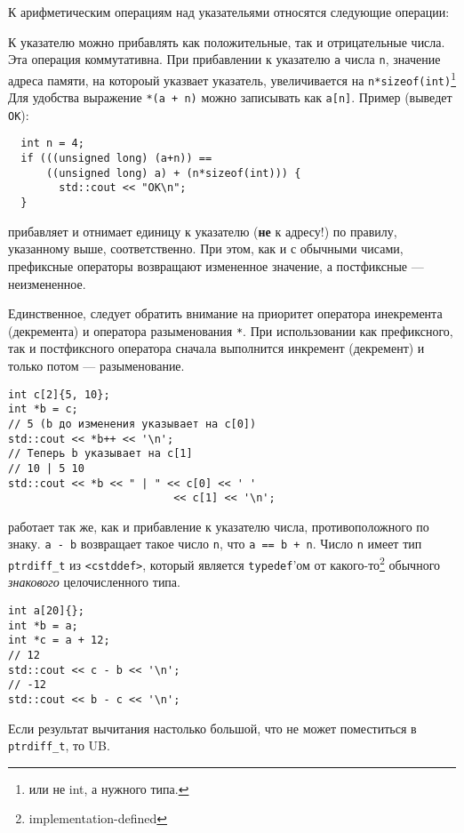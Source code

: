 \documentclass[14pt, a4paper]{extarticle}
\begin{document}
К арифметическим операциям над указательями относятся следующие операции:
\begin{enumerate}
   К указателю можно прибавлять как положительные,
  так и отрицательные числа. Эта операция коммутативна. При прибавлении к указателю
  \verb|a| числа \verb|n|, значение адреса памяти, на котороый указвает указатель,
  увеличивается на \verb|n*sizeof(int)|\footnote{или не int, а нужного типа.}
  Для удобства выражение \verb|*(a + n)| можно записывать как \verb|a[n]|.
  Пример (выведет \verb|OK|):
\begin{verbatim}
  int n = 4;
  if (((unsigned long) (a+n)) ==
      ((unsigned long) a) + (n*sizeof(int))) {
        std::cout << "OK\n";
  }
\end{verbatim}

   прибавляет и отнимает единицу к указателю (\textbf{не} к адресу!) по правилу, указанному
  выше, соответственно. При этом, как и с обычными чисами, префиксные операторы возвращают измененное
  значение, а постфиксные --- неизмененное.

  Единственное, следует обратить внимание на приоритет оператора инекремента (декремента)
  и оператора разыменования \verb|*|. При использовании как префиксного, так и постфиксного
  оператора сначала выполнится инкремент (декремент) и только потом --- разыменование.
\begin{verbatim}
int c[2]{5, 10};
int *b = c;
// 5 (b до изменения указывает на c[0])
std::cout << *b++ << '\n';
// Теперь b указывает на c[1]
// 10 | 5 10
std::cout << *b << " | " << c[0] << ' '
                          << c[1] << '\n';
\end{verbatim}

   работает так же, как и прибавление к указателю
  числа, противоположного по знаку.
   \verb|a - b| возвращает такое число \verb|n|,
  что \verb|a == b + n|. Число \verb|n| имеет тип \verb|ptrdiff_t| из \verb|<cstddef>|,
  который является \verb|typedef|'ом от какого-то\footnote{implementation-defined} обычного
  \textit{знакового} целочисленного типа.
\begin{verbatim}
int a[20]{};
int *b = a;
int *c = a + 12;
// 12
std::cout << c - b << '\n';
// -12
std::cout << b - c << '\n';
\end{verbatim}
  Если результат вычитания настолько большой, что не может поместиться в \verb|ptrdiff_t|,
  то UB.
\end{enumerate}
\end{document}
